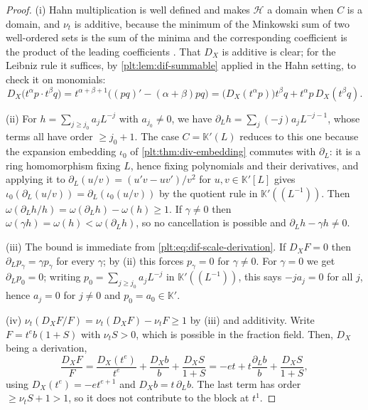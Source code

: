 \documentclass[11pt,oneside]{article}
\theoremstyle{plain}
\theoremstyle{definition}
\theoremstyle{remark}
\newcommand{\K}{\mathbb{K}}
\newcommand{\ordt}{\nu_{t}}                              %
\newcommand{\DX}{D_{X}}                                  %
\begin{document}
\begin{proof}
(i)  Hahn multiplication is well defined and makes \(\mathcal H\) a domain when
\(C\) is a domain, and \(\ordt\) is additive, because the minimum of the
Minkowski sum of two well-ordered sets is the sum of the minima and the
corresponding coefficient is the product of the leading coefficients
\cite{hahn}.  That \(\DX\) is additive is clear; for the Leibniz rule it
suffices, by \cref{plt:lem:dif-summable} applied in the Hahn setting, to check
it on monomials:
\[
  \DX\bigl(t^{\alpha}p\cdot t^{\beta}q\bigr)
  =t^{\alpha+\beta+1}\bigl((pq)'-(\alpha+\beta)pq\bigr)
  =\bigl(\DX(t^{\alpha}p)\bigr)t^{\beta}q+t^{\alpha}p\,\DX(t^{\beta}q).
\]

(ii)  For \(h=\sum_{j\ge j_{0}}a_{j}L^{-j}\) with \(a_{j_{0}}\ne0\), we have
\(\partial_{L}h=\sum_{j}(-j)a_{j}L^{-j-1}\), whose terms all have order
\(\ge j_{0}+1\).  The case \(C=\K'(L)\) reduces to this one because the
expansion embedding \(\iota_{0}\) of \cref{plt:thm:div-embedding} commutes with
\(\partial_{L}\): it is a ring homomorphism fixing \(L\), hence fixing
polynomials and their derivatives, and applying it to
\(\partial_{L}(u/v)=(u'v-uv')/v^{2}\) for \(u,v\in\K'[L]\) gives
\(\iota_{0}(\partial_{L}(u/v))=\partial_{L}(\iota_{0}(u/v))\) by the quotient
rule in \(\K'((L^{-1}))\).  Then \(\omega(\partial_{L}h/h)
=\omega(\partial_{L}h)-\omega(h)\ge1\).  If \(\gamma\ne0\) then
\(\omega(\gamma h)=\omega(h)<\omega(\partial_{L}h)\), so no cancellation is
possible and \(\partial_{L}h-\gamma h\ne0\).

(iii)  The bound is immediate from \cref{plt:eq:dif-scale-derivation}.  If
\(\DX F=0\) then \(\partial_{L}p_{\gamma}=\gamma p_{\gamma}\) for every
\(\gamma\); by (ii) this forces \(p_{\gamma}=0\) for \(\gamma\ne0\).  For
\(\gamma=0\) we get \(\partial_{L}p_{0}=0\); writing
\(p_{0}=\sum_{j\ge j_{0}}a_{j}L^{-j}\) in \(\K'((L^{-1}))\), this says
\(-ja_{j}=0\) for all \(j\), hence \(a_{j}=0\) for \(j\ne0\) and
\(p_{0}=a_{0}\in\K'\).

(iv)  \(\ordt(\DX F/F)=\ordt(\DX F)-\ordt F\ge1\) by (iii) and additivity.
Write \(F=t^{e}b(1+S)\) with \(\ordt S>0\), which is possible in the fraction
field.  Then, \(\DX\) being a derivation,
\[
  \frac{\DX F}{F}
  =\frac{\DX(t^{e})}{t^{e}}+\frac{\DX b}{b}+\frac{\DX S}{1+S}
  =-et+t\frac{\partial_{L}b}{b}+\frac{\DX S}{1+S},
\]
using \(\DX(t^{e})=-et^{e+1}\) and \(\DX b=t\,\partial_{L}b\).  The last term
has order \(\ge\ordt S+1>1\), so it does not contribute to the block at
\(t^{1}\).
\end{proof}
\end{document}
